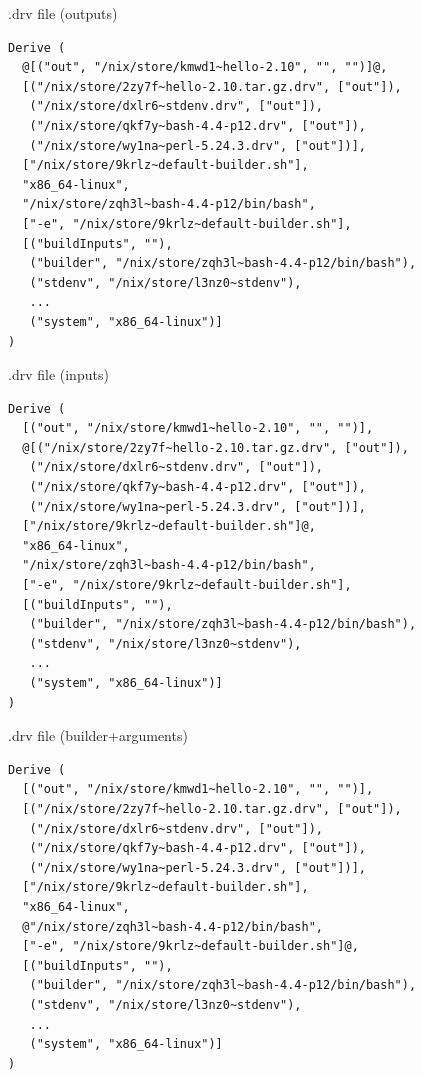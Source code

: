 \documentclass[aspectratio=169]{beamer}
\begin{document}
\begin{frame}[fragile]{.drv file (outputs)}
    \footnotesize
\begin{lstlisting}[style=base,breaklines=false]
Derive (
  @[("out", "/nix/store/kmwd1~hello-2.10", "", "")]@,
  [("/nix/store/2zy7f~hello-2.10.tar.gz.drv", ["out"]),
   ("/nix/store/dxlr6~stdenv.drv", ["out"]),
   ("/nix/store/qkf7y~bash-4.4-p12.drv", ["out"]),
   ("/nix/store/wy1na~perl-5.24.3.drv", ["out"])],
  ["/nix/store/9krlz~default-builder.sh"],
  "x86_64-linux",
  "/nix/store/zqh3l~bash-4.4-p12/bin/bash",
  ["-e", "/nix/store/9krlz~default-builder.sh"],
  [("buildInputs", ""),
   ("builder", "/nix/store/zqh3l~bash-4.4-p12/bin/bash"),
   ("stdenv", "/nix/store/l3nz0~stdenv"),
   ...
   ("system", "x86_64-linux")]
)
\end{lstlisting}
\end{frame}

\begin{frame}[fragile]{.drv file (inputs)}
    \footnotesize
\begin{lstlisting}[style=base,breaklines=false]
Derive (
  [("out", "/nix/store/kmwd1~hello-2.10", "", "")],
  @[("/nix/store/2zy7f~hello-2.10.tar.gz.drv", ["out"]),
   ("/nix/store/dxlr6~stdenv.drv", ["out"]),
   ("/nix/store/qkf7y~bash-4.4-p12.drv", ["out"]),
   ("/nix/store/wy1na~perl-5.24.3.drv", ["out"])],
  ["/nix/store/9krlz~default-builder.sh"]@,
  "x86_64-linux",
  "/nix/store/zqh3l~bash-4.4-p12/bin/bash",
  ["-e", "/nix/store/9krlz~default-builder.sh"],
  [("buildInputs", ""),
   ("builder", "/nix/store/zqh3l~bash-4.4-p12/bin/bash"),
   ("stdenv", "/nix/store/l3nz0~stdenv"),
   ...
   ("system", "x86_64-linux")]
)
\end{lstlisting}
\end{frame}

\begin{frame}[fragile]{.drv file (builder+arguments)}
    \footnotesize
\begin{lstlisting}[style=base,breaklines=false]
Derive (
  [("out", "/nix/store/kmwd1~hello-2.10", "", "")],
  [("/nix/store/2zy7f~hello-2.10.tar.gz.drv", ["out"]),
   ("/nix/store/dxlr6~stdenv.drv", ["out"]),
   ("/nix/store/qkf7y~bash-4.4-p12.drv", ["out"]),
   ("/nix/store/wy1na~perl-5.24.3.drv", ["out"])],
  ["/nix/store/9krlz~default-builder.sh"],
  "x86_64-linux",
  @"/nix/store/zqh3l~bash-4.4-p12/bin/bash",
  ["-e", "/nix/store/9krlz~default-builder.sh"]@,
  [("buildInputs", ""),
   ("builder", "/nix/store/zqh3l~bash-4.4-p12/bin/bash"),
   ("stdenv", "/nix/store/l3nz0~stdenv"),
   ...
   ("system", "x86_64-linux")]
)
\end{lstlisting}
\end{frame}
\end{document}
